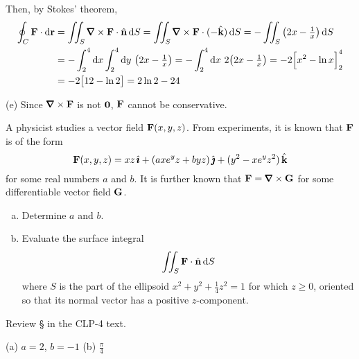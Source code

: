 \begin{solution}
\noindent
Then, by Stokes'
theorem,
\begin{align*}
\oint_C\vF\cdot\dee{\vr}
&=\dblInt_S \vnabla\times\vF\cdot\hn\,\dee{S} 
= \dblInt_S \vnabla\times\vF\cdot(-\hk)\,\dee{S}
= -\dblInt_S \big(2x-\tfrac{1}{x}\big)\,\dee{S}  \\
&= -\int_2^4\dee{x}\int_2^4\dee{y}\ \big(2x-\tfrac{1}{x}\big)
 =-\int_2^4\dee{x}\ 2\big(2x-\tfrac{1}{x}\big)
 = - 2\Big[x^2-\ln x\Big]_2^4 \\
&=-2\big[12-\ln 2\big] =2\ln 2-24
\end{align*}


\noindent (e) Since $\vnabla\times\vF$ is not $\mathbf{0}$, $\mathbf{F}$ cannot
be conservative.
\end{solution}

\begin{question}[M317 2007A] %
A physicist studies a vector field $\mathbf{F}(x, y, z)$. From experiments, 
it is known that $\mathbf{F}$ is of the form
\begin{equation*}
\mathbf{F}(x, y, z) = xz\,\hat{\pmb{\imath}} + (axe^y z + byz)\,\hat{\pmb{\jmath}} + (y^2 - xe^y z^2 )\,\hat{\mathbf{k}}
\end{equation*}
for some real numbers $a$ and $b$. It is further known that 
$\vF = \vnabla\times\vG$ for some differentiable vector field $\mathbf{G}$.
\begin{enumerate}[(a)]
\item
Determine $a$ and $b$.
\item
Evaluate the surface integral
\begin{equation*}
\iint_S\mathbf{F}\cdot\hat{\mathbf{n}}\,\mathrm{d}S
\end{equation*}
where $S$ is the part of the ellipsoid $x^2 + y^2 + \frac{1}{4} z^2 = 1$ 
for which $z \ge 0$, oriented so that its normal vector has a positive $z$-component.
\end{enumerate}
\end{question}

\begin{hint}
Review \S{} in the CLP-4 text.
\end{hint}

\begin{answer} 
(a) $a=2$, $b=-1$\qquad
(b) $\frac{\pi}{4}$
\end{answer}


